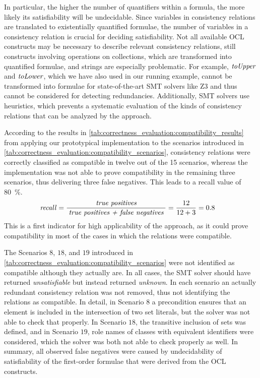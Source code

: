 In particular, the higher the number of quantifiers within a formula, the more likely its satisfiability will be undecidable.
Since variables in consistency relations are translated to existentially quantified formulae, the number of variables in a consistency relation is crucial for deciding satisfiability.
Not all available \gls{OCL} constructs may be necessary to describe relevant consistency relations, still constructs involving operations on collections, which are transformed into quantified formulae, and strings are especially problematic.
For example, $\mathit{toUpper}$ and $\mathit{toLower}$, which we have also used in our running example, cannot be transformed into formulae for state-of-the-art \gls{SMT} solvers like Z3 and thus cannot be considered for detecting redundancies.
Additionally, \gls{SMT} solvers use heuristics, which prevents a systematic evaluation of the kinds of consistency relations that can be analyzed by the approach.

According to the results in \autoref{tab:correctness_evaluation:compatibility_results} from applying our prototypical implementation to the scenarios introduced in \autoref{tab:correctness_evaluation:compatibility_scenarios}, consistency relations were correctly classified as compatible in twelve out of the 15 scenarios, whereas the implementation was not able to prove compatibility in the remaining three scenarios, thus delivering three false negatives.
This leads to a recall value of \SI{80}{\percent}.
\begin{align*}
    &
    \mathit{recall} = \frac{\; \textit{true positives} \;}{\; \textit{true positives + false negatives} \;} = \frac{12}{12+3} = 0.8
\end{align*}
This is a first indicator for high applicability of the approach, as it could prove compatibility in most of the cases in which the relations were compatible.

The Scenarios $8$, $18$, and $19$ introduced in \autoref{tab:correctness_evaluation:compatibility_scenarios} were not identified as compatible although they actually are.
In all cases, the \gls{SMT} solver should have returned \emph{unsatisfiable} but instead returned \emph{unknown}.
In each scenario an actually redundant consistency relation was not removed, thus not identifying the relations as compatible.
In detail, in Scenario $8$ a precondition ensures that an element is included in the intersection of two set literals, but the solver was not able to check that properly.
In Scenario $18$, the transitive inclusion of sets was defined, and in Scenario $19$, role names of classes with equivalent identifiers were considered, which the solver was both not able to check properly as well.
In summary, all observed false negatives were caused by undecidability of satisfiability of the first-order formulae that were derived from the \gls{OCL} constructs.

